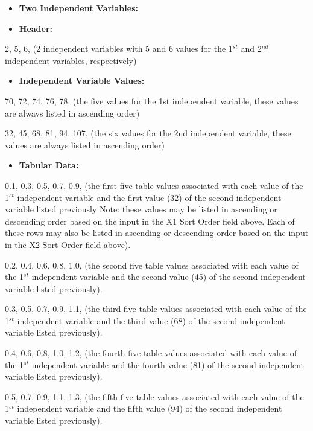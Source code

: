 \begin{itemize}
\item
  \textbf{Two Independent Variables:}
\item
  \textbf{Header:}
\end{itemize}

2, 5, 6, (2 independent variables with 5 and 6 values for the 1\(^{st}\) and 2\(^{nd}\) independent variables, respectively)

\begin{itemize}
\tightlist
\item
  \textbf{Independent Variable Values:}
\end{itemize}

70, 72, 74, 76, 78, (the five values for the 1st independent variable, these values are always listed in ascending order)

32, 45, 68, 81, 94, 107, (the six values for the 2nd independent variable, these values are always listed in ascending order)

\begin{itemize}
\tightlist
\item
  \textbf{Tabular Data:}
\end{itemize}

0.1, 0.3, 0.5, 0.7, 0.9, (the first five table values associated with each value of the 1\(^{st}\) independent variable and the first value (32) of the second independent variable listed previously Note: these values may be listed in ascending or descending order based on the input in the X1 Sort Order field above. Each of these rows may also be listed in ascending or descending order based on the input in the X2 Sort Order field above).

0.2, 0.4, 0.6, 0.8, 1.0, (the second five table values associated with each value of the 1\(^{st}\) independent variable and the second value (45) of the second independent variable listed previously).

0.3, 0.5, 0.7, 0.9, 1.1, (the third five table values associated with each value of the 1\(^{st}\) independent variable and the third value (68) of the second independent variable listed previously).

0.4, 0.6, 0.8, 1.0, 1.2, (the fourth five table values associated with each value of the 1\(^{st}\) independent variable and the fourth value (81) of the second independent variable listed previously).

0.5, 0.7, 0.9, 1.1, 1.3, (the fifth five table values associated with each value of the 1\(^{st}\) independent variable and the fifth value (94) of the second independent variable listed previously).

